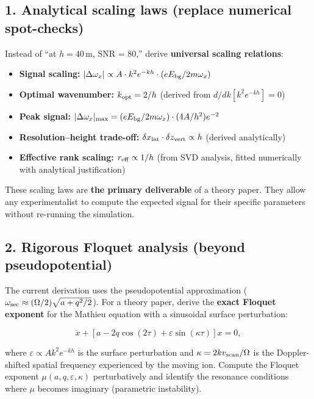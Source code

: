 \documentclass[11pt,a4paper]{article}
\begin{document}
\subsection{1. Analytical scaling laws (replace numerical spot-checks)}

Instead of ``at $h = 40$\,\textmu m, SNR = 80,'' derive \textbf{universal
scaling relations}:

\begin{itemize}
    \item \textbf{Signal scaling:}
    $|\Delta\omega_x| \propto A \cdot k^2 e^{-kh} \cdot (eE_{\rm bg}/2m\omega_x)$
    \item \textbf{Optimal wavenumber:}
    $k_{\rm opt} = 2/h$ (derived from $d/dk[k^2 e^{-kh}] = 0$)
    \item \textbf{Peak signal:}
    $|\Delta\omega_x|_{\rm max} = (eE_{\rm bg}/2m\omega_x) \cdot (4A/h^2)e^{-2}$
    \item \textbf{Resolution--height trade-off:}
    $\delta x_{\rm lat} \cdot \delta z_{\rm vert} \propto h$ (derived analytically)
    \item \textbf{Effective rank scaling:}
    $r_{\rm eff} \propto 1/h$ (from SVD analysis, fitted numerically with
    analytical justification)
\end{itemize}

These scaling laws are \textbf{the primary deliverable} of a theory paper.
They allow any experimentalist to compute the expected signal for their
specific parameters without re-running the simulation.

\subsection{2. Rigorous Floquet analysis (beyond pseudopotential)}

The current derivation uses the pseudopotential approximation
($\omega_{\rm sec} \approx (\Omega/2)\sqrt{a + q^2/2}$).  For a theory
paper, derive the \textbf{exact Floquet exponent} for the Mathieu equation
with a sinusoidal surface perturbation:

\begin{equation}
\ddot{x} + [a - 2q\cos(2\tau) + \varepsilon\sin(\kappa\tau)]x = 0,
\end{equation}

where $\varepsilon \propto A k^2 e^{-kh}$ is the surface perturbation and
$\kappa = 2k v_{\rm scan}/\Omega$ is the Doppler-shifted spatial frequency
experienced by the moving ion.  Compute the Floquet exponent
$\mu(a,q,\varepsilon,\kappa)$ perturbatively and identify the resonance
conditions where $\mu$ becomes imaginary (parametric instability).
\end{document}
